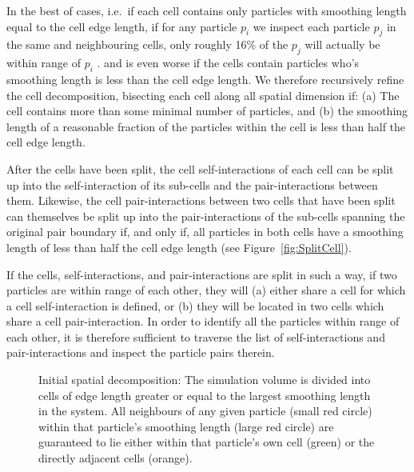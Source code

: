 \documentclass[a4paper,conference]{IEEEtran}
\newcommand{\fig}[1]
    {Figure~\ref{fig:#1}}
\begin{document}
In the best of cases, i.e.~if each cell contains
only particles with smoothing length equal to the cell
edge length, if for any particle $p_i$ we inspect each
particle $p_j$ in the same
and neighbouring cells, only roughly 16\% of the $p_j$
will actually be within range of $p_i$ \cite{ref:Gonnet2007}.
and is even worse if the cells contain particles who's smoothing length
is less than the cell edge length.
We therefore recursively refine the cell decomposition,
bisecting each cell along
all spatial dimension if: (a) The cell contains more than
some minimal number of particles, and (b) the smoothing
length of a reasonable fraction of the particles within
the cell is less than half the cell edge length.

After the cells have been split, the cell self-interactions
of each cell can be split up into the self-interaction
of its sub-cells and the pair-interactions between
them.
Likewise, the cell pair-interactions between two cells
that have been split can themselves be split up into
the pair-interactions of the sub-cells spanning the
original pair boundary if, and only if,
all particles in both cells have a smoothing length of
less than half the cell edge length (see \fig{SplitCell}).

If the cells, self-interactions, and pair-interactions are split
in such a way, if two particles are within range of each other,
they will (a) either share a cell for which a cell self-interaction
is defined, or (b) they will be located in two cells which share
a cell pair-interaction.
In order to identify all the particles within range of each other,
it is therefore sufficient to traverse the list of
self-interactions and pair-interactions and inspect the particle
pairs therein.


\begin{figure}
    \centerline{}
    
    \caption{Initial spatial decomposition: The simulation volume is divided into cells of
        edge length greater or equal to the largest smoothing length in the
        system. All neighbours of any given particle (small red circle) within
        that particle's smoothing length (large red circle) are guaranteed to lie
        either within that particle's own cell (green) or the directly
        adjacent cells (orange).}
    \label{fig:InitialDecomp}
\end{figure}
\end{document}
